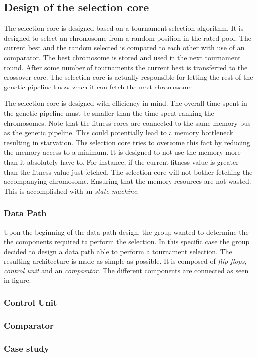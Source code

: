 \subsection {Design of the selection core} \label{fpga:selection:ss:selection_core}

The selection core is designed based on a tournament selection algorithm. It is designed to select an chromosome from a random position in the rated pool. The current best and the random selected is compared to each other with use of an comparator. The best chromosome is stored and used in the next tournament round. After some number of tournaments the current best is transferred to the crossover core. The selection core is actually responsible for letting the rest of the genetic pipeline know when it can fetch the next chromosome. 

The selection core is designed with efficiency in mind. The overall time spent in the genetic pipeline must be smaller than the time spent ranking the chromosomes. Note that the fitness cores are connected to the same memory bus as the genetic pipeline. This could potentially lead to a memory bottleneck resulting in starvation. The selection core tries to overcome this fact by reducing the memory access to a minimum. It is designed to not use the memory more than it absolutely have to. For instance, if the current fitness value is greater than the fitness value just fetched. The selection core will not bother fetching the accompanying chromosome. Ensuring that the memory resources are not wasted. This is accomplished with an \emph{state machine}. 



\subsubsection{Data Path}
Upon the beginning of the data path design, the group wanted to determine the the components required to perform the selection. In this specific case the group decided to design a data path able to perform a tournament selection. The resulting architecture is made as simple as possible.  It is composed of \emph{flip flops}, \emph{control unit} and an \emph{comparator}. The different components are connected as seen in figure.






\subsubsection{Control Unit} \label{fpga:selection:sss:control_unit}



\subsubsection {Comparator} \label{fpga:selection:sss:comparator}



\subsubsection{Case study} \label{fpga:selection:sss:case_study}




